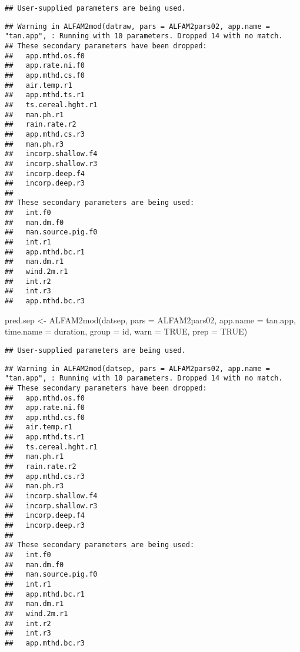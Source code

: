 \documentclass[
  landscape]{article}
\newenvironment{Shaded}{\begin{snugshade}}{\end{snugshade}}
\newcommand{\AttributeTok}[1]{\textcolor[rgb]{0.77,0.63,0.00}{#1}}
\newcommand{\ConstantTok}[1]{\textcolor[rgb]{0.00,0.00,0.00}{#1}}
\newcommand{\FunctionTok}[1]{\textcolor[rgb]{0.00,0.00,0.00}{#1}}
\newcommand{\NormalTok}[1]{#1}
\newcommand{\OtherTok}[1]{\textcolor[rgb]{0.56,0.35,0.01}{#1}}
\newcommand{\StringTok}[1]{\textcolor[rgb]{0.31,0.60,0.02}{#1}}
\begin{document}
\begin{verbatim}
## User-supplied parameters are being used.
\end{verbatim}

\begin{verbatim}
## Warning in ALFAM2mod(datraw, pars = ALFAM2pars02, app.name = "tan.app", : Running with 10 parameters. Dropped 14 with no match.
## These secondary parameters have been dropped:
##   app.mthd.os.f0
##   app.rate.ni.f0
##   app.mthd.cs.f0
##   air.temp.r1
##   app.mthd.ts.r1
##   ts.cereal.hght.r1
##   man.ph.r1
##   rain.rate.r2
##   app.mthd.cs.r3
##   man.ph.r3
##   incorp.shallow.f4
##   incorp.shallow.r3
##   incorp.deep.f4
##   incorp.deep.r3
## 
## These secondary parameters are being used:
##   int.f0
##   man.dm.f0
##   man.source.pig.f0
##   int.r1
##   app.mthd.bc.r1
##   man.dm.r1
##   wind.2m.r1
##   int.r2
##   int.r3
##   app.mthd.bc.r3
\end{verbatim}

\begin{Shaded}
\begin{Highlighting}[]
\NormalTok{pred.sep }\OtherTok{\textless{}{-}} \FunctionTok{ALFAM2mod}\NormalTok{(datsep, }\AttributeTok{pars =}\NormalTok{ ALFAM2pars02, }\AttributeTok{app.name =} \StringTok{\textquotesingle{}tan.app\textquotesingle{}}\NormalTok{, }\AttributeTok{time.name =} \StringTok{\textquotesingle{}duration\textquotesingle{}}\NormalTok{, }
                  \AttributeTok{group =} \StringTok{\textquotesingle{}id\textquotesingle{}}\NormalTok{, }\AttributeTok{warn =} \ConstantTok{TRUE}\NormalTok{, }\AttributeTok{prep =} \ConstantTok{TRUE}\NormalTok{)}
\end{Highlighting}
\end{Shaded}

\begin{verbatim}
## User-supplied parameters are being used.
\end{verbatim}

\begin{verbatim}
## Warning in ALFAM2mod(datsep, pars = ALFAM2pars02, app.name = "tan.app", : Running with 10 parameters. Dropped 14 with no match.
## These secondary parameters have been dropped:
##   app.mthd.os.f0
##   app.rate.ni.f0
##   app.mthd.cs.f0
##   air.temp.r1
##   app.mthd.ts.r1
##   ts.cereal.hght.r1
##   man.ph.r1
##   rain.rate.r2
##   app.mthd.cs.r3
##   man.ph.r3
##   incorp.shallow.f4
##   incorp.shallow.r3
##   incorp.deep.f4
##   incorp.deep.r3
## 
## These secondary parameters are being used:
##   int.f0
##   man.dm.f0
##   man.source.pig.f0
##   int.r1
##   app.mthd.bc.r1
##   man.dm.r1
##   wind.2m.r1
##   int.r2
##   int.r3
##   app.mthd.bc.r3
\end{verbatim}
\end{document}
